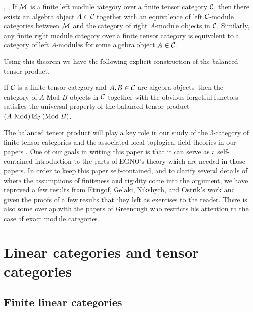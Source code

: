 \documentclass{amsart}
\begin{document}
\begin{theorem}{\cite[Thm 2.11.6]{EGNO}, \cite[\S 3.2]{EO-ftc}, \cite[Thm 1]{MR1976459}} %
	If $\mathcal M$ is a finite left module category over a finite tensor category $\mathcal C$, then there exists an algebra object $A \in \mathcal C$ together with an equivalence of left $\mathcal C$-module categories between $\mathcal M$ and the category of right $A$-module objects in $\mathcal C$.  Similarly, any finite right module category over a finite tensor category is equivalent to a category of left $A$-modules for some algebra object $A \in \mathcal C$.
\end{theorem}

Using this theorem we have the following explicit construction of the balanced tensor product.

\begin{theorem}
If $\mathcal C$ is a finite tensor category and $A, B \in \mathcal C$ are algebra objects, then the category of $A\text{-Mod-}B$ objects in $\mathcal C$ together with the obvious forgetful functors satisfies the universal property of the balanced tensor product $(A\text{-Mod}) \boxtimes_\mathcal C (\text{Mod-}B)$.
\end{theorem}

The balanced tensor product will play a key role in our study of the $3$-category of finite tensor categories and the associated local toplogical field theories in our papers \cite{3TC, DTCI}.  One of our goals in writing this paper is that it can serve as a self-contained introduction to the parts of EGNO's theory which are needed in those papers.  In order to keep this paper self-contained, and to clarify several details of where the assumptions of finiteness and rigidity come into the argument, we have reproved a few results from Etingof, Gelaki, Nikshych, and Ostrik's work and given the proofs of a few results that they left as exercises to the reader.  There is also some overlap with the papers of Greenough \cite{MR2678824, 1102.3411} who restricts his attention to the case of exact module categories.


\section{Linear categories and tensor categories} \label{sec:tc-lincat}

\subsection{Finite linear categories}
\end{document}
